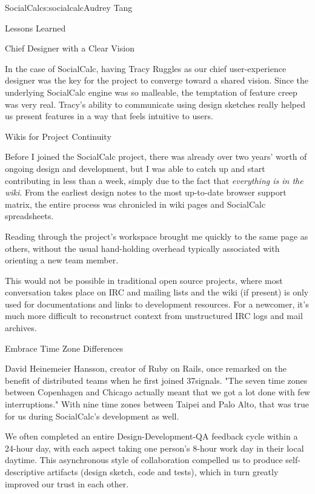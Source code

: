 \begin{aosachapter}{SocialCalc}{s:socialcalc}{Audrey Tang}
\begin{aosasect1}{Lessons Learned}
\begin{aosasect2}{Chief Designer with a Clear Vision}
\begin{quotation}
\end{quotation}

In the case of SocialCalc, having Tracy Ruggles as our chief
user-experience designer was the key for the project to converge
toward a shared vision.  Since the underlying SocialCalc engine was
so malleable, the temptation of feature creep was very real. Tracy's
ability to communicate using design sketches really helped us
present features in a way that feels intuitive to users.

\end{aosasect2}

\begin{aosasect2}{Wikis for Project Continuity}

Before I joined the SocialCalc project, there was already over two
years' worth of ongoing design and development, but I was able to
catch up and start contributing in less than a week, simply due to
the fact that \emph{everything is in the wiki}. From the earliest
design notes to the most up-to-date browser support matrix, the
entire process was chronicled in wiki pages and SocialCalc
spreadsheets.

Reading through the project's workspace brought me quickly to the same
page as others, without the usual hand-holding overhead
typically associated with orienting a new team member.

This would not be possible in traditional open source projects, where
most conversation takes place on IRC and mailing lists and the wiki
(if present) is only used for documentations and links to development
resources.  For a newcomer, it's much more difficult to reconstruct
context from unstructured IRC logs and mail archives.

\end{aosasect2}

\begin{aosasect2}{Embrace Time Zone Differences}

David Heinemeier Hansson, creator of Ruby on Rails, once remarked on
the benefit of distributed teams when he first joined 37signals. "The
seven time zones between Copenhagen and Chicago actually meant that
we got a lot done with few interruptions." With nine time zones
between Taipei and Palo Alto, that was true for us during
SocialCalc's development as well.

We often completed an entire Design-Development-QA feedback cycle
within a 24-hour day, with each aspect taking one person's 8-hour
work day in their local daytime.  This asynchronous style of
collaboration compelled us to produce self-descriptive artifacts
(design sketch, code and tests), which in turn greatly improved our
trust in each other.


\end{aosasect2}
\end{aosasect1}
\end{aosachapter}
